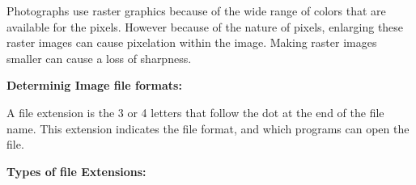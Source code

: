 \documentclass{report}
\begin{document}
    \bigbreak \noindent  
    Photographs use raster graphics because of the wide range of colors that are available for the pixels. 
    However because of the nature of pixels, enlarging these raster images can cause pixelation within the image.
    Making raster images smaller can cause a loss of sharpness.
    
    \bigbreak \noindent 

    \bigbreak \noindent  \bigbreak \noindent \bigbreak \noindent 
    \begin{Large}
        \textbf{Determinig Image file formats:}
    \end{Large}

    \bigbreak \noindent 
    A file extension is the 3 or 4 letters that follow the dot at the end of the file name.
    This extension indicates the file format, and which programs can open the file.
    
    \bigbreak \noindent \bigbreak \noindent 
    \begin{Large}
        \textbf{Types of file Extensions:}
    \end{Large}
\end{document}
